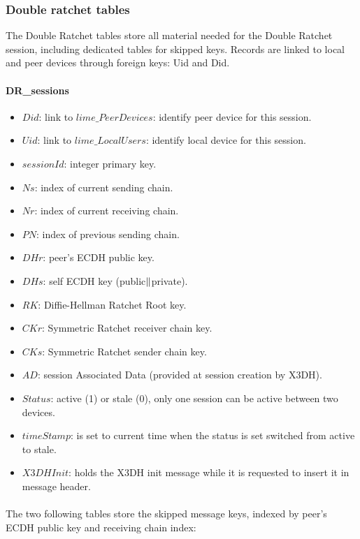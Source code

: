 \documentclass[a4paper,11pt]{article}
\begin{document}
    \subsubsection{Double ratchet tables}
    The Double Ratchet tables store all material needed for the Double Ratchet session, including dedicated tables for skipped keys. Records are linked to local and peer devices through foreign keys: Uid and Did.
    \paragraph*{DR\_sessions}
    \begin{itemize}
      \item $Did$: link to $lime\_PeerDevices$: identify peer device for this session.
      \item $Uid$: link to $lime\_LocalUsers$: identify local device for this session.
      \item $sessionId$: integer primary key.
      \item $Ns$: index of current sending chain.
      \item $Nr$: index of current receiving chain.
      \item $PN$: index of previous sending chain.
      \item $DHr$: peer's ECDH public key.
      \item $DHs$: self ECDH key (public$\Arrowvert $private).
      \item $RK$: Diffie-Hellman Ratchet Root key.
      \item $CKr$: Symmetric Ratchet receiver chain key.
      \item $CKs$: Symmetric Ratchet sender chain key.
      \item $AD$: session Associated Data (provided at session creation by X3DH).
      \item $Status$: active (1) or stale (0), only one session can be active between two devices.
      \item $timeStamp$: is set to current time when the status is set switched from active to stale.
      \item $X3DHInit$: holds the X3DH init message while it is requested to insert it in message header.
    \end{itemize}
    
    \paragraph*{}The two following tables store the skipped message keys, indexed by peer's ECDH public key and receiving chain index:
\end{document}
